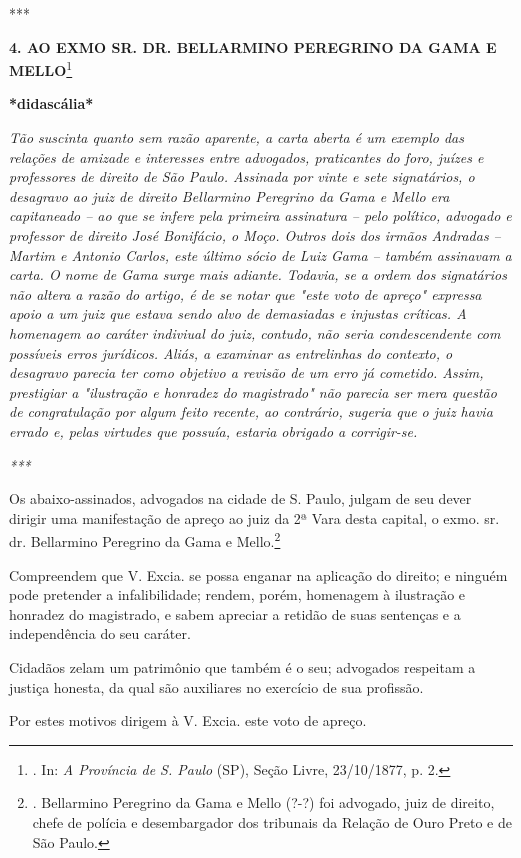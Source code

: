 ***

\textbf{4. AO EXMO SR. DR. BELLARMINO PEREGRINO DA GAMA E
MELLO}\footnote{. In: \emph{A Província de S. Paulo} (SP), Seção Livre,
  23/10/1877, p. 2.}

\textbf{*didascália*}

\emph{Tão suscinta quanto sem razão aparente, a carta aberta é um
exemplo das relações de amizade e interesses entre advogados,
praticantes do foro, juízes e professores de direito de São Paulo.
Assinada por vinte e sete signatários, o desagravo ao juiz de direito
Bellarmino Peregrino da Gama e Mello era capitaneado -- ao que se infere
pela primeira assinatura -- pelo político, advogado e professor de
direito José Bonifácio, o Moço. Outros dois dos irmãos Andradas --
Martim e Antonio Carlos, este último sócio de Luiz Gama -- também
assinavam a carta. O nome de Gama surge mais adiante. Todavia, se a
ordem dos signatários não altera a razão do artigo, é de se notar que
"este voto de apreço" expressa apoio a um juiz que estava sendo alvo de
demasiadas e injustas críticas. A homenagem ao caráter indiviual do
juiz, contudo, não seria condescendente com possíveis erros jurídicos.
Aliás, a examinar as entrelinhas do contexto, o desagravo parecia ter
como objetivo a revisão de um erro já cometido. Assim, prestigiar a
"ilustração e honradez do magistrado" não parecia ser mera questão de
congratulação por algum feito recente, ao contrário, sugeria que o juiz
havia errado e, pelas virtudes que possuía, estaria obrigado a
corrigir-se. }

\emph{***}

Os abaixo-assinados, advogados na cidade de S. Paulo, julgam de seu
dever dirigir uma manifestação de apreço ao juiz da 2ª Vara desta
capital, o exmo. sr. dr. Bellarmino Peregrino da Gama e Mello.\footnote{.
  Bellarmino Peregrino da Gama e Mello (?-?) foi advogado, juiz de
  direito, chefe de polícia e desembargador dos tribunais da Relação de
  Ouro Preto e de São Paulo.}

\protect\hypertarget{Secao_Sem_Titulo-7}{}{}Compreendem que V. Excia. se
possa enganar na aplicação do direito; e ninguém pode pretender a
infalibilidade; rendem, porém, homenagem à ilustração e honradez do
magistrado, e sabem apreciar a retidão de suas sentenças e a
independência do seu caráter.

Cidadãos zelam um patrimônio que também é o seu; advogados respeitam a
justiça honesta, da qual são auxiliares no exercício de sua profissão.

Por estes motivos dirigem à V. Excia. este voto de apreço.

